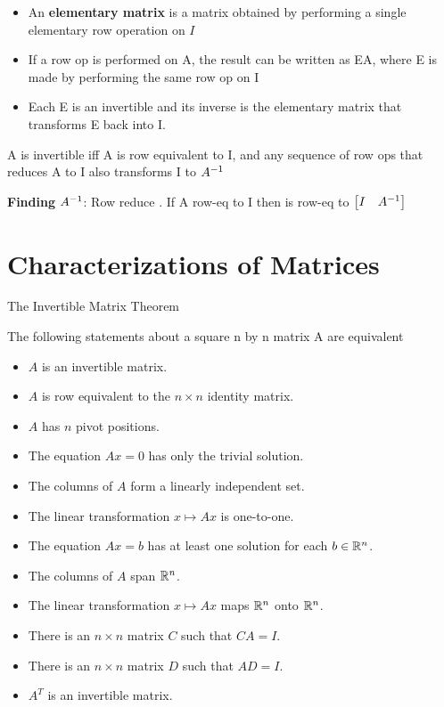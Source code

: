 \documentclass{report}
\begin{document}
\begin{itemize}
    \item An \textbf{elementary matrix} is a matrix obtained by performing a single 
elementary row operation on $I$
    \item If a row op is performed on A, the result can be written as EA, where E is made
    by performing the same row op on I
    \item Each E is an invertible and its inverse is the elementary matrix that transforms E back into I. 
\end{itemize}

\begin{theorem}
    A is invertible iff A is row equivalent to I, and any sequence of row ops that reduces A 
    to I also transforms I to $A^{-1}$
\end{theorem}

\textbf{Finding }$A^{-1}$: Row reduce \matAI. If A row-eq to I then \matAI is row-eq to
$\begin{bmatrix}I & A^{-1}\end{bmatrix}$

\setcounter{section}{2}
\section{Characterizations of Matrices}

\setcounter{theorem}{7}
\begin{theorem} The Invertible Matrix Theorem
\begin{tcolorbox}[colback=blue!5!white, colframe=blue!75!black]
The following statements about a square n by n matrix A are equivalent
\begin{itemize}
    \item \( A \) is an invertible matrix.
    \item \( A \) is row equivalent to the \( n \times n \) identity matrix.
    \item \( A \) has \( n \) pivot positions.
    \item The equation \( Ax = 0 \) has only the trivial solution.
    \item The columns of \( A \) form a linearly independent set.
    \item The linear transformation \( x \mapsto Ax \) is one-to-one.
    \item The equation \( Ax = b \) has at least one solution for each \( b \in \mathbb{R}^n \).
    \item The columns of \( A \) span \( \mathbb{R}^n \).
    \item The linear transformation \( x \mapsto Ax \) maps \( \mathbb{R}^n \) onto \( \mathbb{R}^n \).
    \item There is an \( n \times n \) matrix \( C \) such that \( CA = I \).
    \item There is an \( n \times n \) matrix \( D \) such that \( AD = I \).
    \item \( A^T \) is an invertible matrix.
\end{itemize}
\end{tcolorbox}
\end{theorem}
\end{document}

